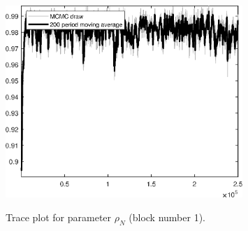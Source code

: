 \begin{figure}[H]
\centering
  \includegraphics[width=0.8\textwidth]{BRS_growth_ext_fd_v1/graphs/TracePlot_rho_N_blck_1}\\
    \caption{Trace plot for parameter ${\rho_N}$ (block number 1).}
\end{figure}
